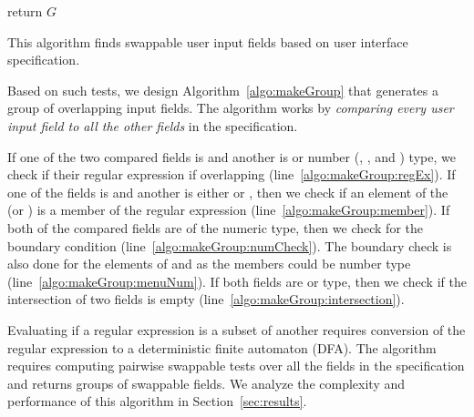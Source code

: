 \begin{algorithm}[h]
{{{                }
                
                \If{$addField = true$}{
                    $g \leftarrow$ empty set of fields\\
                    $g.add(f, f_{in})$\\
                    $G.add(g)$\\
                    $addField \leftarrow false$
                }
        }
    }
    return $G$
\caption{\small{This algorithm finds swappable user input fields based on user interface specification.}} 
\label{algo:makeGroup}
\end{algorithm}

Based on such tests, we design Algorithm~\ref{algo:makeGroup} that generates a group of overlapping input fields. The algorithm works by \emph{comparing every user input field to all the other fields} in the specification.

If one of the two compared fields is \String and another is \string or number (\integer, \float, \Date and \Time) type, we check if their regular expression if overlapping (line~\ref{algo:makeGroup:regEx}). If one of the fields is \String and another is either \menu or \radio, then we check if an element of the \menu (or \radio) is a member of the \String regular expression (line~\ref{algo:makeGroup:member}). 
%
If both of the compared fields are of the numeric type, then we check for the boundary condition (line~\ref{algo:makeGroup:numCheck}). The boundary check is also done for the elements of \menu and \radio as the members could be number type (line~\ref{algo:makeGroup:menuNum}).
If both fields are \menu or \radio type, then we check if the intersection of two fields is empty (line~\ref{algo:makeGroup:intersection}).

Evaluating if a regular expression is a subset of another requires conversion of the regular expression to a deterministic finite automaton (DFA). The algorithm requires computing pairwise swappable tests over all the fields in the specification and returns groups of swappable fields. We analyze the complexity and performance of this algorithm in Section~\ref{sec:results}.


